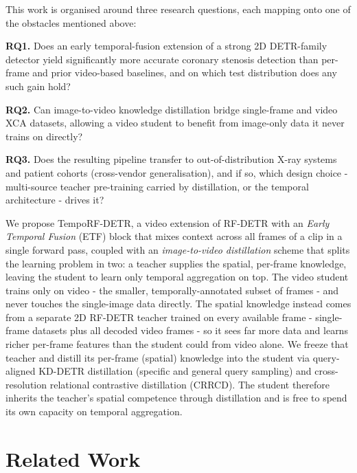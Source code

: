 \documentclass[conference]{IEEEtran}
\begin{document}
This work is organised around three research questions, each mapping onto one of the obstacles mentioned above:

\textbf{RQ1.} Does an early temporal-fusion extension of a strong 2D DETR-family detector yield significantly more accurate coronary stenosis detection than per-frame and prior video-based baselines, and on which test distribution does any such gain hold?

\textbf{RQ2.} Can image-to-video knowledge distillation bridge single-frame and video XCA datasets, allowing a video student to benefit from image-only data it never trains on directly?

\textbf{RQ3.} Does the resulting pipeline transfer to out-of-distribution X-ray systems and patient cohorts (cross-vendor generalisation), and if so, which design choice - multi-source teacher pre-training carried by distillation, or the temporal architecture - drives it?

We propose \mbox{TempoRF-DETR}, a video extension of RF-DETR with an \emph{Early Temporal Fusion} (ETF) block that mixes context across all frames of a clip in a single forward pass, coupled with an \emph{image-to-video distillation} scheme that splits the learning problem in two: a teacher supplies the spatial, per-frame knowledge, leaving the student to learn only temporal aggregation on top. The video student trains only on video - the smaller, temporally-annotated subset of frames - and never touches the single-image data directly. The spatial knowledge instead comes from a separate 2D RF-DETR teacher trained on every available frame - single-frame datasets plus all decoded video frames - so it sees far more data and learns richer per-frame features than the student could from video alone. We freeze that teacher and distill its per-frame (spatial) knowledge into the student via query-aligned KD-DETR distillation (specific and general query sampling) and cross-resolution relational contrastive distillation (CRRCD). The student therefore inherits the teacher's spatial competence through distillation and is free to spend its own capacity on temporal aggregation.

\section{Related Work}
\end{document}
